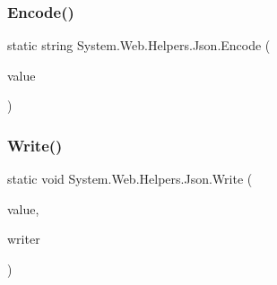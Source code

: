 \subsubsection{\texorpdfstring{Encode()}{Encode()}}
{\footnotesize\ttfamily static string System.\+Web.\+Helpers.\+Json.\+Encode (\begin{DoxyParamCaption}\item[{object}]{value }\end{DoxyParamCaption})\hspace{0.3cm}{\ttfamily [static]}}

\mbox{\label{classSystem_1_1Web_1_1Helpers_1_1Json_a461c4677a0c7755a390cbe247d2cb106_a461c4677a0c7755a390cbe247d2cb106}} 
\subsubsection{\texorpdfstring{Write()}{Write()}}
{\footnotesize\ttfamily static void System.\+Web.\+Helpers.\+Json.\+Write (\begin{DoxyParamCaption}\item[{object}]{value,  }\item[{Text\+Writer}]{writer }\end{DoxyParamCaption})\hspace{0.3cm}{\ttfamily [static]}}

